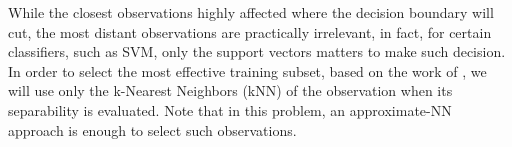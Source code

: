 \begin{figure}[h!]
\center
{}
\qquad
{}
\qquad
{}
\caption{}
\label{fig:knn_sampling}
\end{figure}

While the closest observations highly affected where the decision boundary will cut, the most distant observations are practically irrelevant, in fact, for certain classifiers, such as SVM, only the support vectors matters to make such decision. In order to select the most effective training subset, based on the work of \cite{panda2006}, we will use only the k-Nearest Neighbors (kNN) of the observation when its separability is evaluated. Note that in this problem, an approximate-NN approach \cite{gionis1999, schubert2015} is enough to select such observations.


